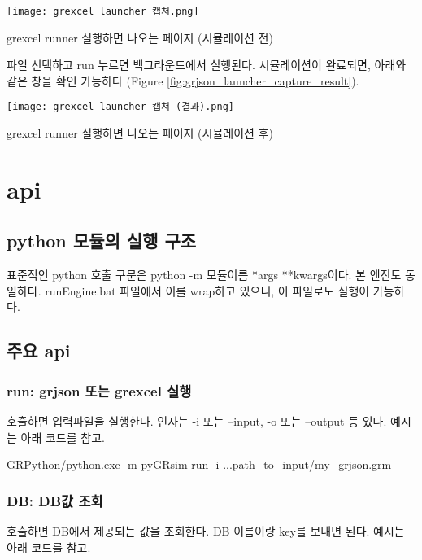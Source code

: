 \begin{defaultfigure}
  \texttt{[image: grexcel launcher 캡처.png]}
  \caption{grexcel runner 실행하면 나오는 페이지 (시뮬레이션 전)}
  \label{fig:grjson_launcher_capture}
\end{defaultfigure}

파일 선택하고 run 누르면 백그라운드에서  실행된다. 시뮬레이션이 완료되면, 아래와 같은 창을 확인 가능하다 (Figure \ref{fig:grjson_launcher_capture_result}).

\begin{defaultfigure}
  \texttt{[image: grexcel launcher 캡처 (결과).png]}
  \caption{grexcel runner 실행하면 나오는 페이지 (시뮬레이션 후)}
  \label{fig:grjson_launcher_capture_result}
\end{defaultfigure}



\section{api}
\subsection{python 모듈의 실행 구조}
표준적인 python 호출 구문은 python -m 모듈이름 *args **kwargs이다. 본 엔진도 동일하다.
runEngine.bat 파일에서 이를 wrap하고 있으니, 이 파일로도 실행이 가능하다.

\subsection{주요 api}

\subsubsection{run: grjson 또는 grexcel 실행}
호출하면 입력파일을 실행한다. 인자는 -i 또는 --input, -o 또는 --output 등 있다. 예시는 아래 코드를 참고.
\begin{tcolorbox}[colback=gray!10, colframe=gray!80, boxrule=0.5pt, left=1em, right=1em]
GRPython/python.exe -m pyGRsim run -i ...path\_to\_input/my\_grjson.grm
\end{tcolorbox}

\subsubsection{DB: DB값 조회}
호출하면 DB에서 제공되는 값을 조회한다. DB 이름이랑 key를 보내면 된다. 예시는 아래 코드를 참고.


